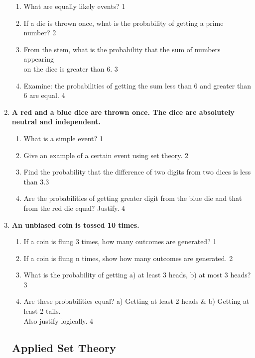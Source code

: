 \documentclass[a4paper,oneside, margin=1.4in]{book}
\begin{document}
\begin{enumerate}
  \begin{enumerate}
    \item
	What are equally likely events? \hfill 1
    \item
	If a die is thrown once, what is the probability of getting a prime 
	number? \hfill 2
    \item  
	From the stem, what is the probability that the sum of numbers appearing
	\\ on the dice is greater than 6. \hfill 3
    \item
	Examine: the probabilities of getting the sum less than 6 and greater 
	than 6 are equal. \hfill 4
  \end{enumerate}

 \item
	  \textbf{A red and a blue dice are thrown once. The dice are absolutely neutral and independent.} 
  
  \begin{enumerate}
    \item
	What is a simple event? \hfill 1
    \item
	Give an example of a certain event using set theory. \hfill 2
    \item  
	Find the probability that the difference of two digits from two dices is less than 3.\hfill 3
    \item
	Are the probabilities of getting greater digit from the blue die and that from the red die equal? Justify. \hfill 4
  \end{enumerate}
  
  \item
	  \textbf{An unbiased coin is tossed 10 times.} 
  
  \begin{enumerate}
    \item
	If a coin is flung 3 times, how many outcomes are generated? \hfill 1
    \item
	If a coin is flung n times, show how many outcomes are generated. \hfill 2
    \item  
	What is the probability of getting a) at least 3 heads, b) at most 3 heads? \hfill 3
    \item
	Are these probabilities equal? a) Getting at least 2 heads \& b) Getting at least 2 tails. \\ Also justify logically. \hfill 4
  \end{enumerate}
  
  \subsection{Applied Set Theory}
  

\end{enumerate}
\end{document}
